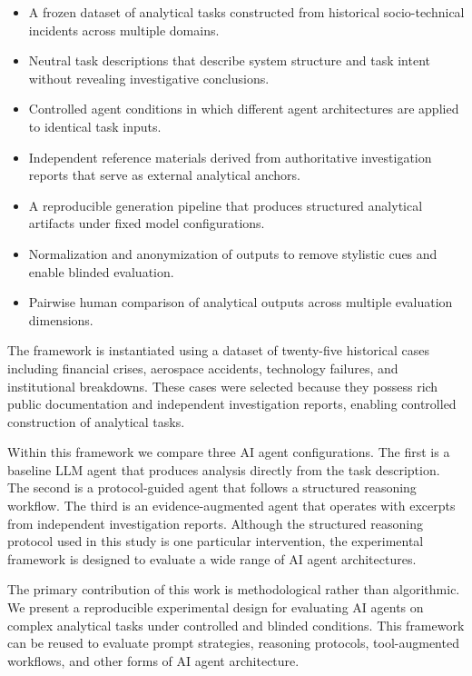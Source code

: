 \begin{itemize}

\item A frozen dataset of analytical tasks constructed from historical
socio-technical incidents across multiple domains.

\item Neutral task descriptions that describe system structure and task intent
without revealing investigative conclusions.

\item Controlled agent conditions in which different agent architectures are
applied to identical task inputs.

\item Independent reference materials derived from authoritative investigation
reports that serve as external analytical anchors.

\item A reproducible generation pipeline that produces structured analytical
artifacts under fixed model configurations.

\item Normalization and anonymization of outputs to remove stylistic cues and
enable blinded evaluation.

\item Pairwise human comparison of analytical outputs across multiple
evaluation dimensions.

\end{itemize}

The framework is instantiated using a dataset of twenty-five historical cases
including financial crises, aerospace accidents, technology failures, and
institutional breakdowns. These cases were selected because they possess rich
public documentation and independent investigation reports, enabling controlled
construction of analytical tasks.

Within this framework we compare three AI agent configurations. The first is a
baseline LLM agent that produces analysis directly from the task description.
The second is a protocol-guided agent that follows a structured reasoning
workflow. The third is an evidence-augmented agent that operates with excerpts
from independent investigation reports. Although the structured reasoning
protocol used in this study is one particular intervention, the experimental
framework is designed to evaluate a wide range of AI agent architectures.

The primary contribution of this work is methodological rather than
algorithmic. We present a reproducible experimental design for evaluating AI
agents on complex analytical tasks under controlled and blinded conditions.
This framework can be reused to evaluate prompt strategies, reasoning
protocols, tool-augmented workflows, and other forms of AI agent architecture.
